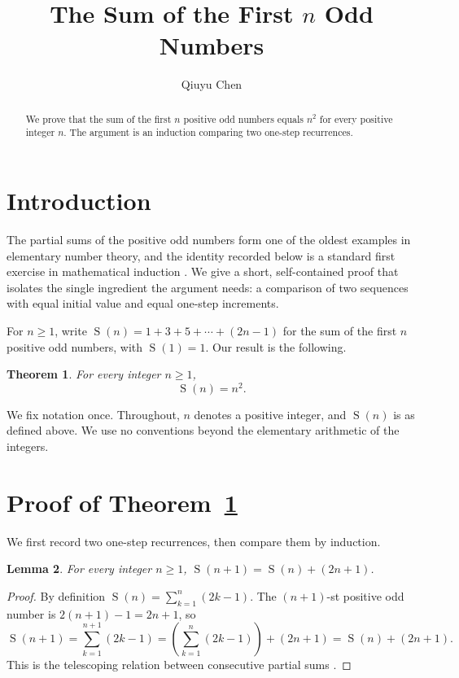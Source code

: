 \documentclass{amsart}
\title{The Sum of the First $n$ Odd Numbers}
\author{Qiuyu Chen}
\date{}
\theoremstyle{plain}
\newtheorem{thm}{Theorem}[section]
\newtheorem{lem}[thm]{Lemma}
\theoremstyle{definition}
\theoremstyle{remark}
\DeclareMathOperator{\Oddsum}{S}
\begin{document}
\begin{abstract}
We prove that the sum of the first $n$ positive odd numbers equals $n^2$ for every positive integer $n$. The argument is an induction comparing two one-step recurrences.
\end{abstract}

\maketitle

\section{Introduction}\label{sec:introduction}

The partial sums of the positive odd numbers form one of the oldest examples in elementary number theory, and the identity recorded below is a standard first exercise in mathematical induction \cite{Exm20}. We give a short, self-contained proof that isolates the single ingredient the argument needs: a comparison of two sequences with equal initial value and equal one-step increments.

For $n \ge 1$, write $\Oddsum(n) = 1 + 3 + 5 + \cdots + (2n-1)$ for the sum of the first $n$ positive odd numbers, with $\Oddsum(1) = 1$. Our result is the following.

\begin{thm}\label{thm:main}
For every integer $n \ge 1$,
\[
  \Oddsum(n) = n^2.
\]
\end{thm}

We fix notation once. Throughout, $n$ denotes a positive integer, and $\Oddsum(n)$ is as defined above. We use no conventions beyond the elementary arithmetic of the integers.

\section{Proof of Theorem~\ref{thm:main}}\label{sec:proof}

We first record two one-step recurrences, then compare them by induction.

\begin{lem}\label{lem:odd-recurrence}
For every integer $n \ge 1$, $\Oddsum(n+1) = \Oddsum(n) + (2n+1)$.
\end{lem}

\begin{proof}
By definition $\Oddsum(n) = \sum_{k=1}^{n} (2k-1)$. The $(n+1)$-st positive odd number is $2(n+1)-1 = 2n+1$, so
\[
  \Oddsum(n+1) = \sum_{k=1}^{n+1} (2k-1) = \left( \sum_{k=1}^{n} (2k-1) \right) + (2n+1) = \Oddsum(n) + (2n+1).
\]
This is the telescoping relation between consecutive partial sums \cite{AC24}.
\end{proof}
\end{document}
